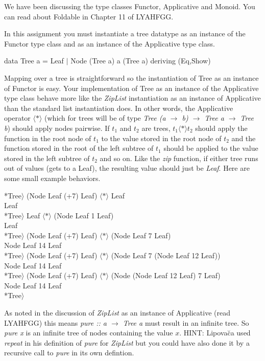 \documentclass[11pt]{article}
\begin{document}

We have been discussing the type classes Functor, Applicative and
Monoid.  You can read about Foldable in Chapter 11 of LYAHFGG.

In this assignment you must instantiate a tree datatype as an instance
of the Functor type class and as an instance of the Applicative type
class.  

\begin{program**}
\> data Tree a = Leaf $\mid$ Node (Tree a) a (Tree a)  deriving (Eq,Show)\\
\end{program**}

Mapping over a tree is straightforward so the instantiation of Tree as an
instance of Functor is easy.  Your implementation of Tree as an instance of the
Applicative type class behave more like the {\it{ZipList}} instantiation as an
instance of Applicative than the standard list instantiation does. In other
words, the Applicative operator $\langle{}*\rangle$ (which for trees will be of
type {\it{Tree (a $\rightarrow$ b) $\rightarrow$ Tree a $\rightarrow$ Tree b}})
should apply nodes pairwise. If $t_1$ and $t_2$ are trees, $t_1 \langle*\rangle
t_2$ should apply the function in the root node of $t_1$ to the value stored in
the root node of $t_2$ and the function stored in the root of the left subtree
of $t_1$ should be applied to the value stored in the left subtree of $t_2$ and
so on.  Like the {\it{zip}} function, if either tree runs out of values (gets
to a Leaf), the resulting value should just be {\it{Leaf}}.  Here are some
small example behaviors.

\begin{program**}
\> *Tree$\rangle$ (Node Leaf (+7) Leaf) $\langle{}*\rangle$ Leaf \\
\> Leaf \\
\> *Tree$\rangle$ Leaf $\langle{}*\rangle$ (Node Leaf 1 Leaf) \\
\> Leaf \\
\> *Tree$\rangle$ (Node Leaf (+7) Leaf) $\langle{}*\rangle$ (Node Leaf 7 Leaf) \\
\> Node Leaf 14 Leaf \\
\> *Tree$\rangle$ (Node Leaf (+7) Leaf) $\langle{}*\rangle$ (Node Leaf 7 (Node Leaf 12 Leaf)) \\
\> Node Leaf 14 Leaf \\
\> *Tree$\rangle$ (Node Leaf (+7) Leaf) $\langle{}*\rangle$ (Node (Node Leaf 12 Leaf) 7 Leaf) \\
\> Node Leaf 14 Leaf \\
\> *Tree$\rangle$  \\
\end{program**}

As noted in the discussion of {\it{ZipList}} as an instance of Applicative
(read LYAHFGG) this means {\it{pure :: a $\rightarrow$ Tree a}} must result in
an infinite tree. So {\it{pure x}} is an infinite tree of nodes containing the
value $x$.  HINT: Lipova\u{c}a used {\em{repeat}} in his definition of
{\it{pure}} for {\it{ZipList}} but you could have also done it by a recursive
call to {\it{pure}} in its own defintion.  
\end{document}
